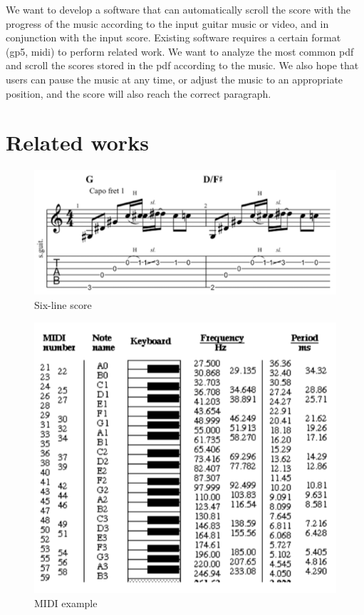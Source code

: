 \documentclass[10pt,twocolumn,letterpaper]{article}
\begin{document}
\begin{CJK}{UTF8}{bsmi}
We want to develop a software that can automatically scroll the score with the progress of the music according to the input guitar music or video, and in conjunction with the input score. Existing software requires a certain format (gp5, midi) to perform related work. We want to analyze the most common pdf and scroll the scores stored in the pdf according to the music. We also hope that users can pause the music at any time, or adjust the music to an appropriate position, and the score will also reach the correct paragraph.

\section{Related works}

\begin{figure}[t]
\begin{center}
   \includegraphics[width=0.8\linewidth]{relate_works_1.png}
\end{center}
   \caption{Six-line score}
\label{fig:relate_works_1}
\end{figure}

\begin{figure}[t]
\begin{center}
   \includegraphics[width=0.8\linewidth]{relate_works_2.png}
\end{center}
   \caption{MIDI example}
\label{fig:relate_works_2}
\end{figure}


\end{CJK}
\end{document}
